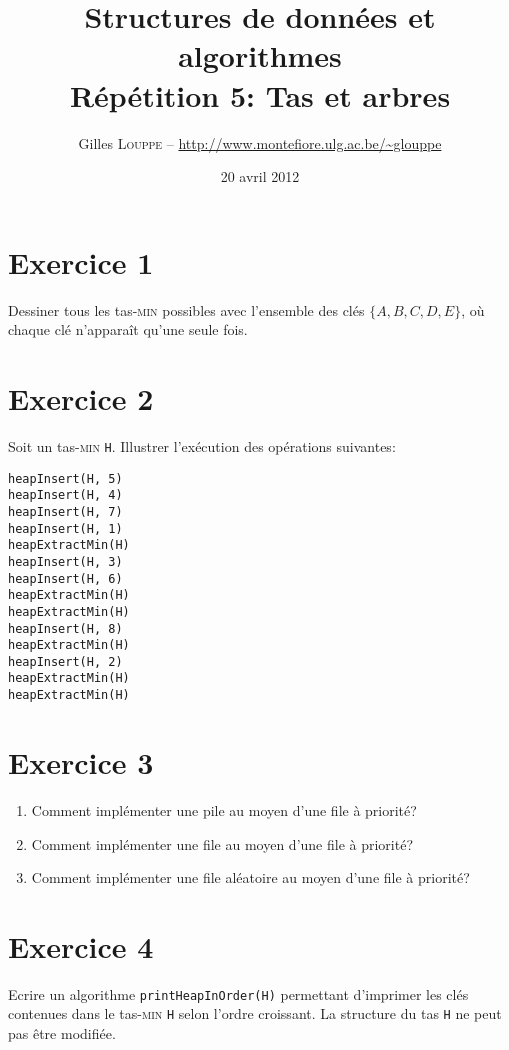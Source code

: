 \documentclass[a4paper,10pt]{article}
\title{
    \textbf{Structures de données et algorithmes}\\
    Répétition 5: Tas et arbres
}
\author{Gilles \textsc{Louppe} -- \url{http://www.montefiore.ulg.ac.be/~glouppe}}
\date{20 avril 2012}
\begin{document}
\maketitle

\section*{Exercice 1}

Dessiner tous les tas-\textsc{min} possibles avec l'ensemble des clés $\{A, B, C, D, E\}$, où chaque clé n'apparaît qu'une seule fois.

\section*{Exercice 2}

Soit un tas-\textsc{min} \texttt{H}. Illustrer l'exécution des opérations suivantes:

\begin{verbatim}
heapInsert(H, 5)
heapInsert(H, 4)
heapInsert(H, 7)
heapInsert(H, 1)
heapExtractMin(H)
heapInsert(H, 3)
heapInsert(H, 6)
heapExtractMin(H)
heapExtractMin(H)
heapInsert(H, 8)
heapExtractMin(H)
heapInsert(H, 2)
heapExtractMin(H)
heapExtractMin(H)
\end{verbatim}

\section*{Exercice 3}

\begin{enumerate}

\item Comment implémenter une pile au moyen d'une file à priorité?

\item Comment implémenter une file au moyen d'une file à priorité?

\item Comment implémenter une file aléatoire au moyen d'une file à priorité?

\end{enumerate}

\section*{Exercice 4}

Ecrire un algorithme \texttt{printHeapInOrder(H)} permettant d'imprimer les clés
contenues dans le tas-\textsc{min} \texttt{H} selon l'ordre croissant. La
structure du tas \texttt{H} ne peut pas être modifiée.
\end{document}
